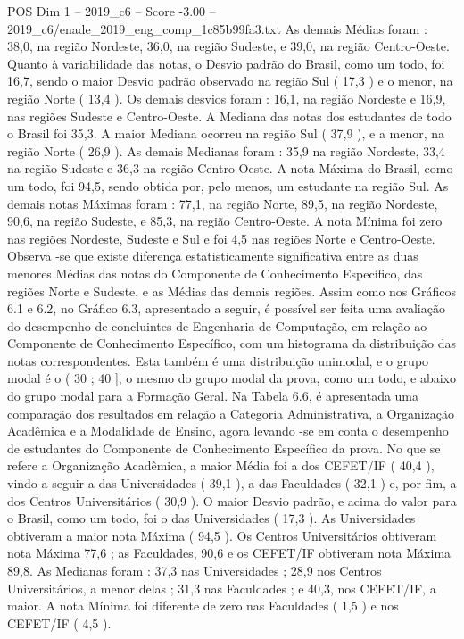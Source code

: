 \begin{textsample}{POS Dim 1 – 2019\_c6 – Score -3.00 – 2019\_c6/enade\_2019\_eng\_comp\_1c85b99fa3.txt}
As demais Médias foram : 38,0, na região Nordeste, 36,0, na região Sudeste, e 39,0, na região Centro-Oeste.
Quanto à variabilidade das notas, o Desvio padrão do Brasil, como um todo, foi 16,7, sendo o maior Desvio padrão observado na região Sul ( 17,3 ) e o menor, na região Norte ( 13,4 ).
Os demais desvios foram : 16,1, na região Nordeste e 16,9, nas regiões Sudeste e Centro-Oeste.
A Mediana das notas dos estudantes de todo o Brasil foi 35,3.
A maior Mediana ocorreu na região Sul ( 37,9 ), e a menor, na região Norte ( 26,9 ).
As demais Medianas foram : 35,9 na região Nordeste, 33,4 na região Sudeste e 36,3 na região Centro-Oeste.
A nota Máxima do Brasil, como um todo, foi 94,5, sendo obtida por, pelo menos, um estudante na região Sul.
As demais notas Máximas foram : 77,1, na região Norte, 89,5, na região Nordeste, 90,6, na região Sudeste, e 85,3, na região Centro-Oeste.
A nota Mínima foi zero nas regiões Nordeste, Sudeste e Sul e foi 4,5 nas regiões Norte e Centro-Oeste.
Observa -se que existe diferença estatisticamente significativa entre as duas menores Médias das notas do Componente de Conhecimento Específico, das regiões Norte e Sudeste, e as Médias das demais regiões.
Assim como nos Gráficos 6.1 e 6.2, no Gráfico 6.3, apresentado a seguir, é possível ser feita uma avaliação do desempenho de concluintes de Engenharia de Computação, em relação ao Componente de Conhecimento Específico, com um histograma da distribuição das notas correspondentes.
Esta também é uma distribuição unimodal, e o grupo modal é o ( 30 ; 40 ], o mesmo do grupo modal da prova, como um todo, e abaixo do grupo modal para a Formação Geral.
Na Tabela 6.6, é apresentada uma comparação dos resultados em relação a Categoria Administrativa, a Organização Acadêmica e a Modalidade de Ensino, agora levando -se em conta o desempenho de estudantes do Componente de Conhecimento Específico da prova.
No que se refere a Organização Acadêmica, a maior Média foi a dos CEFET/IF ( 40,4 ), vindo a seguir a das Universidades ( 39,1 ), a das Faculdades ( 32,1 ) e, por fim, a dos Centros Universitários ( 30,9 ).
O maior Desvio padrão, e acima do valor para o Brasil, como um todo, foi o das Universidades ( 17,3 ).
As Universidades obtiveram a maior nota Máxima ( 94,5 ).
Os Centros Universitários obtiveram nota Máxima 77,6 ; as Faculdades, 90,6 e os CEFET/IF obtiveram nota Máxima 89,8.
As Medianas foram : 37,3 nas Universidades ; 28,9 nos Centros Universitários, a menor delas ; 31,3 nas Faculdades ; e 40,3, nos CEFET/IF, a maior.
A nota Mínima foi diferente de zero nas Faculdades ( 1,5 ) e nos CEFET/IF ( 4,5 ).

\end{textsample}
